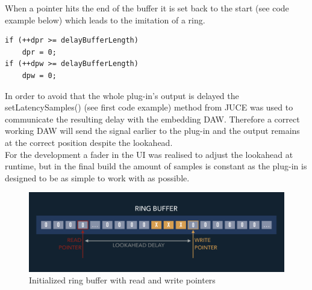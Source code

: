 When a pointer hits the end of the buffer it is set back to the start (see code example below) which leads to the imitation of a ring.\\

\begin{lstlisting}[frame=single]
if (++dpr >= delayBufferLength)
	dpr = 0;
if (++dpw >= delayBufferLength)
	dpw = 0;
\end{lstlisting}

In order to avoid that the whole plug-in's output is delayed the setLatencySamples() (see first code example) method from JUCE was used to communicate the resulting delay with the embedding DAW. Therefore a correct working DAW will send the signal earlier to the plug-in and the output remains at the correct position despite the lookahead.\\
For the development a fader in the UI was realised to adjust the lookahead at runtime, but in the final build the amount of samples is constant as the plug-in is designed to be as simple to work with as possible.\\

\begin{figure}[H]
\includegraphics[width=\textwidth]{images/ring_buffer}
\caption{Initialized ring buffer with read and write pointers}
\label{RBuf}
\end{figure}

